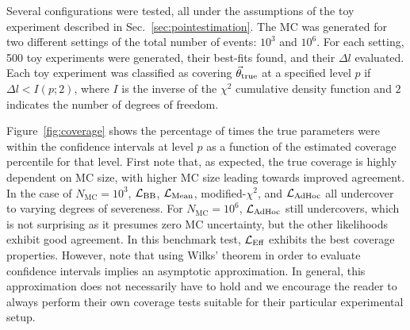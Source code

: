 Several configurations were tested, all under the assumptions of the toy experiment described in Sec.~\ref{sec:pointestimation}.
The MC was generated for two different settings of the total number of events: $10^3$ and $10^6$.
For each setting, 500 toy experiments were generated, their best-fits found, and their $\Delta l$ evaluated.
Each toy experiment was classified as covering $\vec{\theta}_{\rm true}$ at a specified level $p$ if $\Delta l < I(p;2)$, where $I$ is the inverse of the $\chi^2$ cumulative density function and $2$ indicates the number of degrees of freedom.

Figure~\ref{fig:coverage} shows the percentage of times the true parameters were within the confidence intervals at level $p$ as a function of the estimated coverage percentile for that level.
First note that, as expected, the true coverage is highly dependent on MC size, with higher MC size leading towards improved agreement.
In the case of $N_\mathrm{MC}=10^3$, $\mathcal{L}_{\textmd{BB}}$, $\mathcal{L}_{\textmd{Mean}}$, modified-$\chi^2$, and $\mathcal{L}_{\textmd{AdHoc}}$ all undercover to varying degrees of severeness.
For $N_\mathrm{MC}=10^6$, $\mathcal{L}_{\textmd{AdHoc}}$ still undercovers, which is not surprising as it presumes zero MC uncertainty, but the other likelihoods exhibit good agreement.
In this benchmark test, $\mathcal{L}_\textmd{Eff}$ exhibits the best coverage properties.
However, note that using Wilks’ theorem in order to evaluate confidence intervals implies an asymptotic approximation.
In general, this approximation does not necessarily have to hold and we encourage the reader to always perform their own coverage tests suitable for their particular experimental setup.
